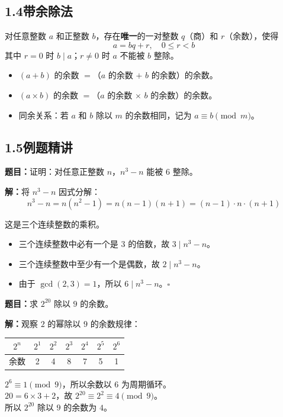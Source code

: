 \documentclass[12pt, a4paper]{ctexart}
\begin{document}
\subsection*{1.4\quad 带余除法}

\begin{knowledgebox}[带余除法]
对任意整数 $a$ 和正整数 $b$，存在\textbf{唯一}的一对整数 $q$（商）和 $r$（余数），使得
\[a = bq + r,\quad 0\leqslant r < b\]
其中 $r=0$ 时 $b\mid a$；$r\neq 0$ 时 $a$ 不能被 $b$ 整除。
\end{knowledgebox}

\begin{tipbox}[余数的性质]
\begin{itemize}[itemsep=1pt]
  \item $(a+b)$ 的余数 $=$（$a$ 的余数 $+$ $b$ 的余数）的余数。
  \item $(a\times b)$ 的余数 $=$（$a$ 的余数 $\times$ $b$ 的余数）的余数。
  \item 同余关系：若 $a$ 和 $b$ 除以 $m$ 的余数相同，记为 $a\equiv b\pmod{m}$。
\end{itemize}
\end{tipbox}

\subsection*{1.5\quad 例题精讲}

\begin{examplebox}[【例1】整除的证明]
\textbf{题目：}证明：对任意正整数 $n$，$n^3-n$ 能被 $6$ 整除。
\end{examplebox}

\textbf{解：}\;将 $n^3-n$ 因式分解：
\[n^3 - n = n(n^2-1) = n(n-1)(n+1) = (n-1)\cdot n\cdot (n+1)\]

这是三个连续整数的乘积。
\begin{itemize}[itemsep=2pt]
  \item 三个连续整数中必有一个是 $3$ 的倍数，故 $3\mid n^3-n$。
  \item 三个连续整数中至少有一个是偶数，故 $2\mid n^3-n$。
  \item 由于 $\gcd(2,3)=1$，所以 $6\mid n^3-n$。\hfill$\square$
\end{itemize}

\begin{examplebox}[【例2】弃九法与数字根]
\textbf{题目：}求 $2^{20}$ 除以 $9$ 的余数。
\end{examplebox}

\textbf{解：}\;观察 $2$ 的幂除以 $9$ 的余数规律：
\begin{center}
\renewcommand{\arraystretch}{1.2}
\begin{tabular}{c|cccccc}
$2^n$ & $2^1$ & $2^2$ & $2^3$ & $2^4$ & $2^5$ & $2^6$ \\
\hline
余数 & 2 & 4 & 8 & 7 & 5 & 1
\end{tabular}
\end{center}
$2^6\equiv 1\pmod{9}$，所以余数以 $6$ 为周期循环。\\
$20=6\times 3+2$，故 $2^{20}\equiv 2^2\equiv 4\pmod{9}$。\\
所以 $2^{20}$ 除以 $9$ 的余数为 $\boxed{4}$。
\end{document}
